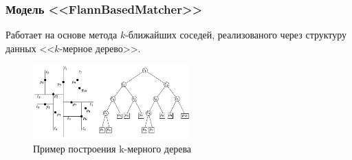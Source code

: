 \documentclass[t]{beamer}
\begin{document}
	\begin{frame}
		\frametitle{Модель <<FlannBasedMatcher>>}
		
		Работает на основе метода $k$-ближайших соседей, реализованого через структуру данных <<$k$-мерное дерево>>.
		\begin{figure}[h!]
			\centering
			\includegraphics[width = 6cm]{image/chapter_2/kdtreeexample}	
			\caption{Пример построения k-мерного дерева}
			\label{fig:kdtreeexample}
		\end{figure}
	\end{frame}
	
\end{document}
